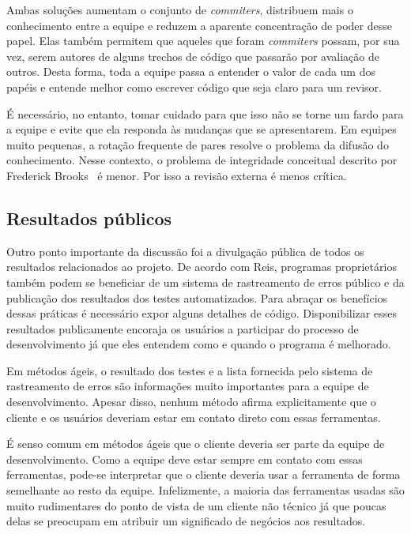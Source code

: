 Ambas soluções aumentam o conjunto de \emph{commiters}, distribuem
mais o conhecimento entre a equipe e reduzem a aparente concentração
de poder desse papel. Elas também permitem que aqueles que foram
\emph{commiters} possam, por sua vez, serem autores de alguns trechos
de código que passarão por avaliação de outros. Desta forma, toda a
equipe passa a entender o valor de cada um dos papéis e entende melhor
como escrever código que seja claro para um revisor.

É necessário, no entanto, tomar cuidado para que isso não se torne um
fardo para a equipe e evite que ela responda às mudanças que se
apresentarem. Em equipes muito pequenas, a rotação frequente de pares
resolve o problema da difusão do conhecimento. Nesse contexto, o
problema de integridade conceitual descrito por Frederick
Brooks~\cite{Brooks1975-mmme} é menor. Por isso a revisão externa é
menos crítica.

\subsection{Resultados públicos}
\label{subsec:publicity}

Outro ponto importante da discussão foi a divulgação pública de todos
os resultados relacionados ao projeto. De acordo com Reis, programas
proprietários também podem se beneficiar de um sistema de rastreamento
de erros público e da publicação dos resultados dos testes
automatizados. Para abraçar os benefícios dessas práticas é necessário
expor alguns detalhes de código. Disponibilizar esses resultados
publicamente encoraja os usuários a participar do processo de
desenvolvimento já que eles entendem como e quando o programa é
melhorado.

Em métodos ágeis, o resultado dos testes e a lista fornecida pelo
sistema de rastreamento de erros são informações muito importantes
para a equipe de desenvolvimento. Apesar disso, nenhum método afirma
explicitamente que o cliente e os usuários deveriam estar em contato
direto com essas ferramentas.

É senso comum em métodos ágeis que o cliente deveria ser parte da
equipe de desenvolvimento. Como a equipe deve estar sempre em contato
com essas ferramentas, pode-se interpretar que o cliente deveria usar
a ferramenta de forma semelhante ao resto da equipe. Infelizmente, a
maioria das ferramentas usadas são muito rudimentares do ponto de
vista de um cliente não técnico já que poucas delas se preocupam em
atribuir um significado de negócios aos resultados.

